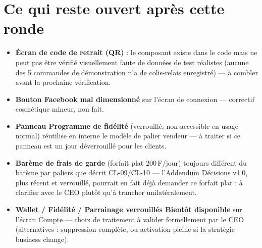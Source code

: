 \documentclass[11pt]{article}
\begin{document}
\section*{Ce qui reste ouvert après cette ronde}
\begin{itemize}
  \item \textbf{Écran de code de retrait (QR)} : le composant existe dans le code mais ne peut pas être vérifié visuellement faute de données de test réalistes (aucune des 5 commandes de démonstration n'a de colis-relais enregistré) — à combler avant la prochaine vérification.
  \item \textbf{Bouton Facebook mal dimensionné} sur l'écran de connexion — correctif cosmétique mineur, non fait.
  \item \textbf{Panneau \og Programme de fidélité\fg{}} (verrouillé, non accessible en usage normal) réutilise en interne le modèle de palier vendeur — à traiter si ce panneau est un jour déverrouillé pour les clients.
  \item \textbf{Barème de frais de garde} (forfait plat 200\,F/jour) toujours différent du barème par paliers que décrit CL-09/CL-10 — l'Addendum Décisions v1.0, plus récent et verrouillé, pourrait en fait déjà demander ce forfait plat : à clarifier avec le CEO plutôt qu'à trancher unilatéralement.
  \item \textbf{Wallet / Fidélité / Parrainage verrouillés \og Bientôt disponible\fg{}} sur l'écran Compte — choix de traitement à valider formellement par le CEO (alternatives : suppression complète, ou activation pleine si la stratégie business change).
\end{itemize}
\end{document}
